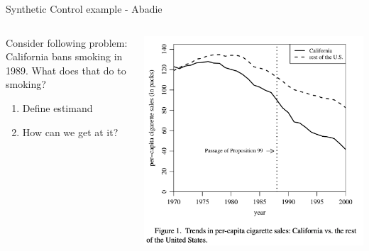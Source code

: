 \documentclass[notes,11pt, aspectratio=169]{beamer}
\newenvironment{wideitemize}{\itemize\addtolength{\itemsep}{10pt}}{\enditemize}
\begin{document}
\begin{frame}{Synthetic Control example - Abadie }
  \begin{columns}[T] %
    \begin{column}{0.5\textwidth}
      \begin{wideitemize}
      \item Consider following problem: California bans smoking in 1989. What does that do to smoking?
        \begin{enumerate}
        \item Define estimand
        \item How can we get at it?
        \end{enumerate}
      \item 
        \end{wideitemize}
    \end{column}%
    \hfill%
    \begin{column}{.5\textwidth}
      \includegraphics[width=\linewidth]{images/abadie2010a.png}
    \end{column}%
  \end{columns}
\end{frame}
\end{document}
